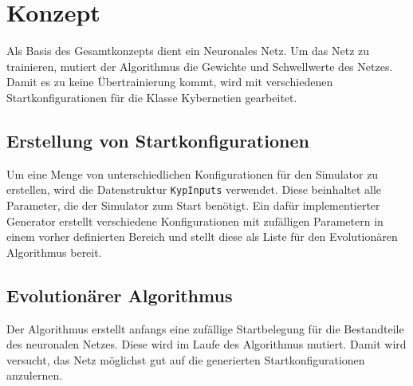 \chapter{Konzept}

Als Basis des Gesamtkonzepts dient ein Neuronales Netz. Um das Netz zu trainieren, mutiert der Algorithmus die Gewichte und Schwellwerte des Netzes. Damit es zu keine Übertrainierung kommt, wird mit verschiedenen Startkonfigurationen für die Klasse Kybernetien gearbeitet.

\section{Erstellung von Startkonfigurationen}
Um eine Menge von unterschiedlichen Konfigurationen für den Simulator zu erstellen, wird die Datenstruktur \verb+KypInputs+ verwendet. Diese beinhaltet alle Parameter, die der Simulator zum Start benötigt. Ein dafür implementierter Generator erstellt verschiedene Konfigurationen mit zufälligen Parametern in einem vorher definierten Bereich und stellt diese als Liste für den Evolutionären Algorithmus bereit. 

\section{Evolutionärer Algorithmus}
Der Algorithmus erstellt anfangs eine zufällige Startbelegung für die Bestandteile des neuronalen Netzes. Diese wird im Laufe des Algorithmus mutiert. Damit wird versucht, das Netz möglichst gut auf die generierten Startkonfigurationen anzulernen.
